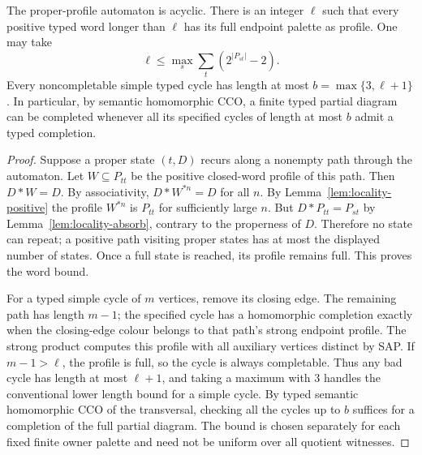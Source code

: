\begin{theorem}
\label{thm:locality-bound}
The proper-profile automaton is acyclic. There is an integer $\ell$
such that every positive typed word longer than $\ell$ has its full
endpoint palette as profile. One may take
\[
 \ell\le\max_s\sum_t(2^{|P_{st}|}-2).
\]
Every noncompletable simple typed cycle has length at most
$b=\max\{3,\ell+1\}$. In particular, by semantic homomorphic CCO,
a finite typed partial diagram can be completed whenever all its
specified cycles of length at most $b$ admit a typed completion.
\end{theorem}
\begin{proof}
Suppose a proper state $(t,D)$ recurs along a nonempty path through
the automaton. Let $W\subseteq P_{tt}$ be the positive closed-word
profile of this path. Then $D*W=D$. By associativity,
$D*W^{*n}=D$ for all $n$. By
Lemma~\ref{lem:locality-positive} the profile $W^{*n}$ is
$P_{tt}$ for sufficiently large $n$. But
$D*P_{tt}=P_{st}$ by Lemma~\ref{lem:locality-absorb}, contrary to
the properness of $D$. Therefore no state can repeat; a positive
path visiting proper states has at most the displayed number of
states. Once a full state is reached, its profile remains full.
This proves the word bound.

For a typed simple cycle of $m$ vertices, remove its closing edge.
The remaining path has length $m-1$; the specified cycle has a
homomorphic completion exactly when the closing-edge colour belongs
to that path's strong endpoint profile. The strong product computes
this profile with all auxiliary vertices distinct by SAP. If
$m-1>\ell$, the profile is full, so the cycle is always completable.
Thus any bad cycle has length at most $\ell+1$, and taking a maximum
with $3$ handles the conventional lower length bound for a simple
cycle. By typed semantic homomorphic CCO of the transversal, checking
all the cycles up to $b$ suffices for a completion of the full partial
diagram. The bound is chosen separately for each fixed finite owner
palette and need not be uniform over all quotient witnesses.
\end{proof}
